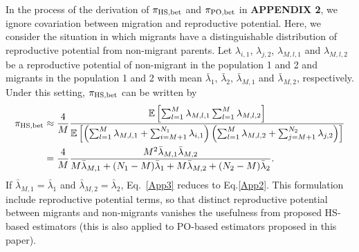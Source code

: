 \documentclass[12pt, English]{article}
\begin{document}
\begin{spacing}{1.9}
In the process of the derivation of $\pi_{\rm HS,bet}$ and $\pi_{\rm PO,bet}$ in {\bf APPENDIX 2}, we ignore covariation between migration and reproductive potential. Here, we consider the situation in which migrants have a distinguishable distribution of reproductive potential from non-migrant parents. Let $\lambda_{i,1}$, $\lambda_{j,2}$, $\lambda_{M,l,1}$ and $\lambda_{M,l,2}$ be a reproductive potential of non-migrant in the population 1 and 2 and migrants in the population 1 and 2 with mean ${\bar \lambda_{1}}$, ${\bar \lambda_{2}}$, ${\bar \lambda_{M,1}}$ and ${\bar \lambda_{M,2}}$, respectively. Under this setting, $\pi_{\rm HS,bet}$ can be written by
\begin{align}
\pi_{\rm HS,bet} &\approx \frac{4}{M}  \frac{ \mathbb{E}\left[ \sum_{l=1}^M \lambda_{M,l,1} \sum_{l=1}^M \lambda_{M,l,2} \right]} {\mathbb{E}\left[ \left(\sum_{l=1}^{M} \lambda_{M,l,1} + \sum_{i=M+1}^{N_1} \lambda_{i,1}\right) \left(\sum_{l=1}^{M} \lambda_{M,l,2} + \sum_{j=M+1}^{N_2} \lambda_{j,2}\right) \right] }\nonumber\\ 
&= \frac{4}{M} \frac{ M^2 {\bar \lambda_{M,1}} {\bar \lambda_{M,2}} } { M {\bar \lambda_{M,1}} + (N_1 - M) {\bar \lambda_1} + M {\bar \lambda_{M,2}} + (N_2 - M) {\bar \lambda_2} }.
\label{App3}
\end{align}
If ${\bar \lambda_{M,1}} = {\bar \lambda_{1}}$ and ${\bar \lambda_{M,2}} = {\bar \lambda_{2}}$, Eq.~\ref{App3} reduces to Eq.\ref{App2}. This formulation include reproductive potential terms, so that distinct reproductive potential between migrants and non-migrants vanishes the usefulness from proposed HS-based estimators (this is also applied to PO-based estimators proposed in this paper). 

\clearpage




\end{spacing}
\end{document}

